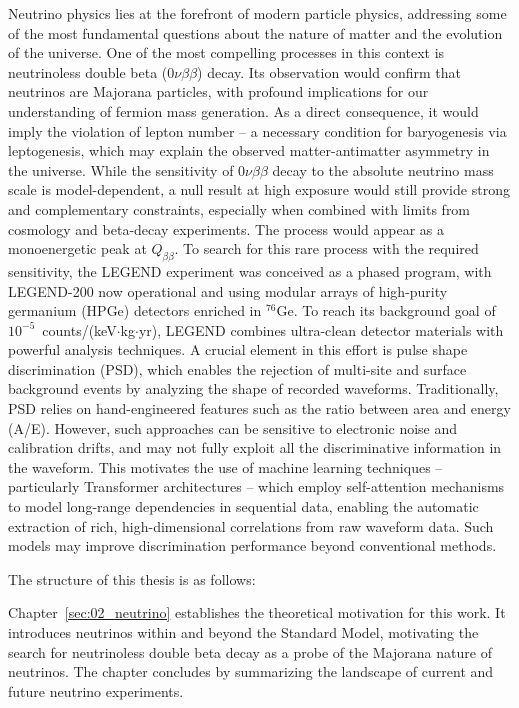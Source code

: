 
Neutrino physics lies at the forefront of modern particle physics, addressing some of the most fundamental questions about the nature of matter and the evolution of the universe. One of the most compelling processes in this context is neutrinoless double beta ($0 \nu \beta \beta$) decay. 
Its observation would confirm that neutrinos are Majorana particles, with profound implications for our understanding of fermion mass generation. As a direct consequence, it would imply the violation of lepton number -- a necessary condition for baryogenesis via leptogenesis, which may explain the observed matter-antimatter asymmetry in the universe. 
While the sensitivity of $0 \nu \beta \beta$ decay to the absolute neutrino mass scale is model-dependent, a null result at high exposure would still provide strong and complementary constraints, especially when combined with limits from cosmology and beta-decay experiments. The process would appear as a monoenergetic peak at $Q_{\beta \beta}$. To search for this rare process with the required sensitivity, the LEGEND experiment was conceived as a phased program, with LEGEND-200 now operational and using modular arrays of high-purity germanium (HPGe) detectors enriched in $^{76}$Ge. 
To reach its background goal of $10^{-5}$~counts/(keV$\cdot$kg$\cdot$yr), LEGEND combines ultra-clean detector materials with powerful analysis techniques. A crucial element in this effort is pulse shape discrimination (PSD), which enables the rejection of multi-site and surface background events by analyzing the shape of recorded waveforms. 
Traditionally, PSD relies on hand-engineered features such as the ratio between area and energy (A/E). However, such approaches can be sensitive to electronic noise and calibration drifts, and may not fully exploit all the discriminative information in the waveform. 
This motivates the use of machine learning techniques -- particularly Transformer architectures -- which employ self-attention mechanisms to model long-range dependencies in sequential data, enabling the automatic extraction of rich, high-dimensional correlations from raw waveform data. Such models may improve discrimination performance beyond conventional methods.

\noindent The structure of this thesis is as follows: 

Chapter~\ref{sec:02_neutrino} establishes the theoretical motivation for this work. It introduces neutrinos within and beyond the Standard Model, motivating the search for neutrinoless double beta decay as a probe of the Majorana nature of neutrinos. The chapter concludes by summarizing the landscape of current and future neutrino experiments. 

